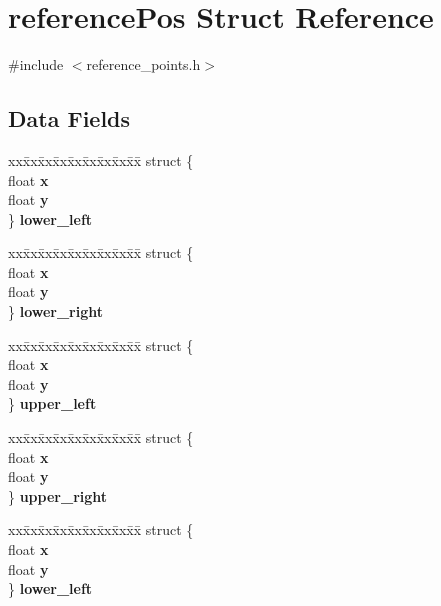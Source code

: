\section{reference\-Pos Struct Reference}
\label{structreference_pos}


{\ttfamily \#include $<$reference\-\_\-points.\-h$>$}

\subsection*{Data Fields}
\begin{DoxyCompactItemize}
\item 
\begin{tabbing}
xx\=xx\=xx\=xx\=xx\=xx\=xx\=xx\=xx\=\kill
struct \{\\
\>float {\bf x}\\
\>float {\bf y}\\
\} {\bf lower\_left}\\

\end{tabbing}\item 
\begin{tabbing}
xx\=xx\=xx\=xx\=xx\=xx\=xx\=xx\=xx\=\kill
struct \{\\
\>float {\bf x}\\
\>float {\bf y}\\
\} {\bf lower\_right}\\

\end{tabbing}\item 
\begin{tabbing}
xx\=xx\=xx\=xx\=xx\=xx\=xx\=xx\=xx\=\kill
struct \{\\
\>float {\bf x}\\
\>float {\bf y}\\
\} {\bf upper\_left}\\

\end{tabbing}\item 
\begin{tabbing}
xx\=xx\=xx\=xx\=xx\=xx\=xx\=xx\=xx\=\kill
struct \{\\
\>float {\bf x}\\
\>float {\bf y}\\
\} {\bf upper\_right}\\

\end{tabbing}\item 
\begin{tabbing}
xx\=xx\=xx\=xx\=xx\=xx\=xx\=xx\=xx\=\kill
struct \{\\
\>float {\bf x}\\
\>float {\bf y}\\
\} {\bf lower\_left}\\


\end{tabbing}
\end{DoxyCompactItemize}
